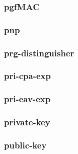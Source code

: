 \begin{frame}\frametitle{pgfMAC}
\begin{figure}
\begin{center}

\end{center}
\end{figure}
\end{frame}
\begin{frame}\frametitle{pnp}
\begin{figure}
\begin{center}

\end{center}
\end{figure}
\end{frame}
\begin{frame}\frametitle{prg-distinguisher}
\begin{figure}
\begin{center}

\end{center}
\end{figure}
\end{frame}
\begin{frame}\frametitle{pri-cpa-exp}
\begin{figure}
\begin{center}

\end{center}
\end{figure}
\end{frame}
\begin{frame}\frametitle{pri-eav-exp}
\begin{figure}
\begin{center}

\end{center}
\end{figure}
\end{frame}
\begin{frame}\frametitle{private-key}
\begin{figure}
\begin{center}

\end{center}
\end{figure}
\end{frame}
\begin{frame}\frametitle{public-key}
\begin{figure}
\begin{center}

\end{center}
\end{figure}
\end{frame}
